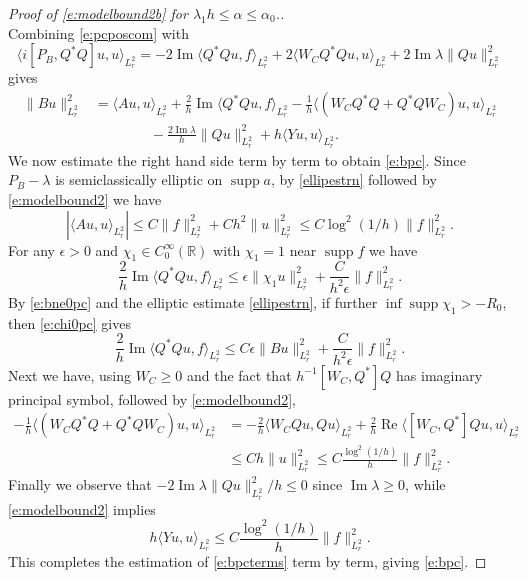 \documentclass[reqno, 12pt]{amsart}
\newcommand \R {\mathbb{R}}
\DeclareMathOperator \re {Re}
\DeclareMathOperator \im {Im}
\DeclareMathOperator \supp {supp}
\theoremstyle{definition}
\numberwithin{equation}{section}
\numberwithin{prop}{section}
\numberwithin{figure}{section}
\begin{document}
\begin{proof}[Proof of \eqref{e:modelbound2b} for $\lambda_1 h \le \alpha \le \alpha_0$.]
\begin{equation}
\end{equation}
Combining \eqref{e:pcposcom} with
\[
 \langle i[P_B,Q^*Q]u,u\rangle_{L^2_r}  
 = -2\im\langle Q^*Qu,f\rangle_{L^2_r} +2\langle W_C Q^*Q u,u\rangle_{L^2_r} + 2 \im \lambda \|Q u\|^2_{L^2_r}
\]
gives
\begin{equation}\label{e:bpcterms}\begin{split}
\|Bu\|^2_{L^2_r} &= \langle Au,u\rangle_{L^2_r} + \frac 2 h\im\langle Q^*Qu,f\rangle_{L^2_r} - \frac 1 h\langle (W_C Q^*Q  + Q^*Q W_C)u,u\rangle_{L^2_r} \\
&\qquad\qquad - \frac{2 \im \lambda}h \|Q u\|^2_{L^2_r} + h \langle Y u,u\rangle_{L^2_r}.
\end{split}\end{equation}
We now estimate the right hand side term by term to obtain \eqref{e:bpc}. Since $P_B - \lambda$ is semiclassically elliptic on $\supp a$, by \eqref{ellipestrn} followed by \eqref{e:modelbound2} we have
\[
|\langle Au,u\rangle_{L^2_r}| \le C \|f\|_{L^2_r}^2 + Ch^2 \|u\|^2_{L^2_r} \le C\log^2(1/h) \|f\|_{L^2_r}^2.
\]
For any $\epsilon>0$ and $\chi_1 \in C_0^\infty(\R)$ with $\chi_1 = 1$ near $\supp f$ we have
\[
\frac 2 h\im\langle Q^*Qu,f\rangle_{L^2_r} \le \epsilon \| \chi_1 u\|^2_{L^2_r} + \frac C{h^2\epsilon} \|f\|^2_{L^2_r}. 
\]
By \eqref{e:bne0pc} and the elliptic estimate \eqref{ellipestrn}, if further $\inf \supp \chi_1 >-R_0$, then \eqref{e:chi0pc} gives
\[
\frac 2 h\im\langle Q^*Qu,f\rangle_{L^2_r} \le C \epsilon \| B u\|^2_{L^2_r} + \frac C{h^2\epsilon} \|f\|^2_{L^2_r}.
\]
Next we have, using $W_C \ge 0$ and  the fact that $h^{-1}[W_C, Q^*]Q$ has imaginary principal symbol, %
 followed by \eqref{e:modelbound2},
\[\begin{split}
- \frac 1 h\langle (W_C Q^*Q  + Q^*Q W_C)u,u\rangle_{L^2_r} &= - \frac 2 h \langle W_C Qu,Qu\rangle_{L^2_r} + \frac 2 h \re \langle [W_C, Q^*]Q u,u\rangle_{L^2_r}\\
& \le C h\|u\|^2_{L^2_r} \le C \frac{\log^2(1/h)}h\|f\|_{L^2_r}^2.
\end{split}\]
Finally we observe that $- 2 \im \lambda \|Q u\|^2_{L^2_r}/h \le 0$ since $\im \lambda \ge 0$, while \eqref{e:modelbound2} implies
\[
h \langle Y u,u\rangle_{L^2_r} \le C \frac{\log^2(1/h)}h\|f\|_{L^2_r}^2.
\]
This completes the estimation of \eqref{e:bpcterms} term by term, giving \eqref{e:bpc}.
\end{proof}
\end{document}
